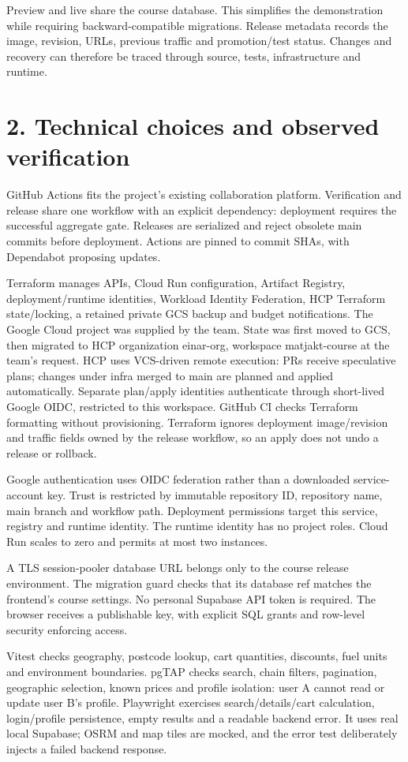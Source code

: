 \documentclass[10pt,a4paper]{article}
\begin{document}
Preview and live share the course database. This simplifies the demonstration while requiring backward-compatible migrations. Release metadata records the image, revision, URLs, previous traffic and promotion/test status. Changes and recovery can therefore be traced through source, tests, infrastructure and runtime.
\newpage
\section*{2. Technical choices and observed verification}
GitHub Actions fits the project's existing collaboration platform. Verification and release share one workflow with an explicit dependency: deployment requires the successful aggregate gate. Releases are serialized and reject obsolete main commits before deployment. Actions are pinned to commit SHAs, with Dependabot proposing updates.

Terraform manages APIs, Cloud Run configuration, Artifact Registry, deployment/runtime identities, Workload Identity Federation, HCP Terraform state/locking, a retained private GCS backup and budget notifications. The Google Cloud project was supplied by the team. State was first moved to GCS, then migrated to HCP organization einar-org, workspace matjakt-course at the team's request. HCP uses VCS-driven remote execution: PRs receive speculative plans; changes under infra merged to main are planned and applied automatically. Separate plan/apply identities authenticate through short-lived Google OIDC, restricted to this workspace. GitHub CI checks Terraform formatting without provisioning. Terraform ignores deployment image/revision and traffic fields owned by the release workflow, so an apply does not undo a release or rollback.

Google authentication uses OIDC federation rather than a downloaded service-account key. Trust is restricted by immutable repository ID, repository name, main branch and workflow path. Deployment permissions target this service, registry and runtime identity. The runtime identity has no project roles. Cloud Run scales to zero and permits at most two instances.

A TLS session-pooler database URL belongs only to the course release environment. The migration guard checks that its database ref matches the frontend's course settings. No personal Supabase API token is required. The browser receives a publishable key, with explicit SQL grants and row-level security enforcing access.

Vitest checks geography, postcode lookup, cart quantities, discounts, fuel units and environment boundaries. pgTAP checks search, chain filters, pagination, geographic selection, known prices and profile isolation: user A cannot read or update user B's profile. Playwright exercises search/details/cart calculation, login/profile persistence, empty results and a readable backend error. It uses real local Supabase; OSRM and map tiles are mocked, and the error test deliberately injects a failed backend response.
\end{document}
